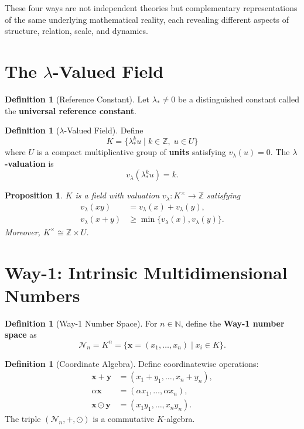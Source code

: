 \documentclass[12pt, reqno]{amsart}
\theoremstyle{plain}
\newtheorem{proposition}[theorem]{Proposition}
\theoremstyle{definition}
\newtheorem{definition}[theorem]{Definition}
\theoremstyle{remark}
\newcommand{\cN}{\mathcal{N}}
\newcommand{\bZ}{\mathbb{Z}}
\newcommand{\bN}{\mathbb{N}}
\newcommand{\lstar}{\lambda_{*}}
\newcommand{\val}{v_{\lambda}}
\newcommand{\unit}{U}
\begin{document}
These four ways are not independent theories but complementary representations of the same underlying 
mathematical reality, each revealing different aspects of structure, relation, scale, and dynamics.

\section{The $\lambda$-Valued Field}

\begin{definition}[Reference Constant]
Let $\lstar \neq 0$ be a distinguished constant called the \textbf{universal reference constant}.
\end{definition}

\begin{definition}[$\lambda$-Valued Field]
Define
\[
K = \{ \lstar^{k}u \mid k \in \bZ,\; u \in \unit \}
\]
where $\unit$ is a compact multiplicative group of \textbf{units} satisfying $\val(u)=0$. The 
\textbf{$\lambda$-valuation} is
\[
\val(\lstar^{k}u) = k.
\]
\end{definition}

\begin{proposition}
$K$ is a field with valuation $\val: K^{\times} \to \bZ$ satisfying
\begin{align*}
\val(xy) &= \val(x) + \val(y), \\
\val(x+y) &\geq \min\{\val(x),\val(y)\}.
\end{align*}
Moreover, $K^{\times} \cong \bZ \times \unit$.
\end{proposition}

\section{Way-1: Intrinsic Multidimensional Numbers}

\begin{definition}[Way-1 Number Space]
For $n \in \bN$, define the \textbf{Way-1 number space} as
\[
\cN_{n} = K^{n} = \{ \mathbf{x} = (x_1,\ldots,x_n) \mid x_i \in K \}.
\]
\end{definition}

\begin{definition}[Coordinate Algebra]
Define coordinatewise operations:
\begin{align*}
\mathbf{x} + \mathbf{y} &= (x_1 + y_1,\ldots,x_n + y_n), \\
\alpha\mathbf{x} &= (\alpha x_1,\ldots,\alpha x_n), \\
\mathbf{x} \odot \mathbf{y} &= (x_1y_1,\ldots,x_ny_n).
\end{align*}
The triple $(\cN_n, +, \odot)$ is a commutative $K$-algebra.
\end{definition}
\end{document}
